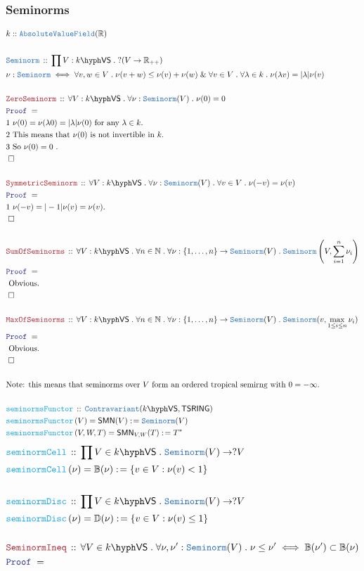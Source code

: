 \documentclass[12pt]{scrartcl}
\newcommand{\TYPE}[1]{\textcolor{NavyBlue}{\mathtt{#1}}}
\newcommand{\FUNC}[1]{\textcolor{Cerulean}{\mathtt{#1}}}
\newcommand{\LOGIC}[1]{\textcolor{Blue}{\mathtt{#1}}}
\newcommand{\THM}[1]{\textcolor{Maroon}{\mathtt{#1}}}
\renewcommand{\.}{\; . \;}
\newcommand{\de}{: \kern 0.1pc =}
\newcommand{\Act}[1]{\left( #1 \right)}
\newcommand{\Theorem}[2]{& \THM{#1} \, :: \, #2 \\ & \Proof = \\ }
\newcommand{\DeclareType}[2]{& \TYPE{#1} \, :: \, #2 \\}
\newcommand{\DefineType}[3]{& #1 : \TYPE{#2} \iff #3 \\}
\newcommand{\DeclareFunc}[2]{& \FUNC{#1} \, :: \, #2 \\}
\newcommand{\DefineNamedFunc}[4]{&  \FUNC{#1}\Act{#2} = #3 \de #4 \\}
\newcommand{\Page}[1]{ \begin{align*} #1 \end{align*}   }
\newcommand{\Explain}[1]{& \text{#1.} \\}
\renewcommand{\And}{\; \& \;}
\newcommand{\Reals}{\mathbb{R} }
\newcommand{\Nat}{\mathbb{N} }
\newcommand{\QED}{\; \square}
\newcommand{\EndProof}{& \QED \\}
\newcommand{\Proof}{\LOGIC{Proof} \; }
\newcommand{\Contra}{\TYPE{Contravariant}}
\newcommand{\Cell}{\mathbb{B}}
\newcommand{\Disc}{\mathbb{D}}
\newcommand{\VS}[1]{#1\hyph\mathsf{VS}} %
\newcommand{\AVF}{\TYPE{AbsoluteValueField}}
\newcommand{\Seminorm}{\TYPE{Seminorm}}
\begin{document}
\subsubsection{Seminorms}
\Page{
	& k :: \AVF(\Reals) \\
	\\
	\DeclareType{Seminorm}
	{
		\prod V : \VS{k} \.
		?(V \to \Reals_{++})
	}
	\DefineType{\nu}{Seminorm}
	{
		\forall v,w \in V \. \nu(v + w) \le \nu(v) + \nu(w) 
		\And
		\forall v \in V \. \forall \lambda \in k \. \nu(\lambda v) = |\lambda|\nu(v)
	}
	\\
	\Theorem{ZeroSeminorm}
	{
		\forall V : \VS{k} \.
		\forall \nu : \Seminorm(V) \. 
		\nu(0) = 0
	}
	\Explain{1  $\nu(0) = \nu(\lambda 0) = |\lambda|\nu(0)$ for any $\lambda \in k$}
	\Explain{2 This means that $\nu(0)$ is not invertible in $k$}
	\Explain{3 So $\nu(0) = 0$ }
	\EndProof
	\\
	\Theorem{SymmetricSeminorm}
	{
		\forall V : \VS{k} \.
		\forall \nu : \Seminorm(V) \.
		\forall v \in V \. 
		\nu(-v) = \nu(v)
	}
	\Explain{1  $\nu(-v) = |-1|\nu(v) = \nu(v)$}
	\EndProof
	\\
	\Theorem{SumOfSeminorms}
	{
		\forall V : \VS{k} \.
		\forall n \in \Nat \.
		\forall \nu : \{1,\ldots,n\} \to \Seminorm(V) \.
		\Seminorm\left(V, \sum^n_{i=1} \nu_i \right)
	}
	\Explain{ Obvious}
	\EndProof
	\\
	\Theorem{MaxOfSeminorms}
	{
		\forall V : \VS{k} \.
		\forall n \in \Nat \.
		\forall \nu : \{1,\ldots,n\} \to \Seminorm(V) \.
		\Seminorm(v, \max_{1\le i \le n} \nu_i )
	}
	\Explain{ Obvious}
	\EndProof
	\\
	\Explain{Note: this means that seminorms over $V$ form an ordered tropical semirng
		with $0 = -\infty$}
	\\
	\DeclareFunc{seminormsFunctor}{\Contra(\VS{k},\mathsf{TSRING})}
	\DefineNamedFunc{seminormsFunctor}{V}{\mathsf{SMN}(V)}{\TYPE{Seminorm}(V)}
	\DefineNamedFunc{seminormsFunctor}{V,W,T}{\mathsf{SMN}_{V,W}(T)}{T^*}
}\Page{
	\DeclareFunc{seminormCell}
	{
		\prod V  \in \VS{k} \.
		\Seminorm(V) \to ?V
	}
	\DefineNamedFunc{seminormCell}{\nu}{\Cell(\nu)}
	{
		\{ v \in V : \nu(v) < 1  \}
	}               
	\\
	\DeclareFunc{seminormDisc}
	{
		\prod V  \in \VS{k} \.
		\Seminorm(V) \to ?V
	}
	\DefineNamedFunc{seminormDisc}{\nu}{\Disc(\nu)}
	{
		\{ v \in V : \nu(v) \le 1  \}
	}
	\\
	\Theorem{SeminormIneq}
	{
		\forall V \in \VS{k} \.
		\forall \nu,\nu' : \Seminorm(V) \.
		\nu \le \nu' 
		\iff
		\Cell(\nu') \subset \Cell(\nu)
}}
\end{document}
